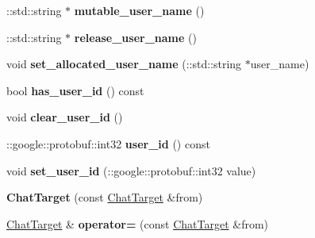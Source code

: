\begin{DoxyCompactItemize}
\item 
\hypertarget{classSimpleChat_1_1ChatTarget_a00afe8502b37643f560038dea704e5ff}{\-::std\-::string $\ast$ {\bfseries mutable\-\_\-user\-\_\-name} ()}\label{classSimpleChat_1_1ChatTarget_a00afe8502b37643f560038dea704e5ff}

\item 
\hypertarget{classSimpleChat_1_1ChatTarget_a7156ab60121584ae5364003f778588fe}{\-::std\-::string $\ast$ {\bfseries release\-\_\-user\-\_\-name} ()}\label{classSimpleChat_1_1ChatTarget_a7156ab60121584ae5364003f778588fe}

\item 
\hypertarget{classSimpleChat_1_1ChatTarget_a82559c41d4d25af52c6a5f83814eac69}{void {\bfseries set\-\_\-allocated\-\_\-user\-\_\-name} (\-::std\-::string $\ast$user\-\_\-name)}\label{classSimpleChat_1_1ChatTarget_a82559c41d4d25af52c6a5f83814eac69}

\item 
\hypertarget{classSimpleChat_1_1ChatTarget_a0831d25def649fe153f0e3075bbbfac6}{bool {\bfseries has\-\_\-user\-\_\-id} () const }\label{classSimpleChat_1_1ChatTarget_a0831d25def649fe153f0e3075bbbfac6}

\item 
\hypertarget{classSimpleChat_1_1ChatTarget_a0e07f02eeb547853bdce8e2745d55fd2}{void {\bfseries clear\-\_\-user\-\_\-id} ()}\label{classSimpleChat_1_1ChatTarget_a0e07f02eeb547853bdce8e2745d55fd2}

\item 
\hypertarget{classSimpleChat_1_1ChatTarget_a7e162e2a192107d514d2350c3ae190d2}{\-::google\-::protobuf\-::int32 {\bfseries user\-\_\-id} () const }\label{classSimpleChat_1_1ChatTarget_a7e162e2a192107d514d2350c3ae190d2}

\item 
\hypertarget{classSimpleChat_1_1ChatTarget_aa8851c988d1010b224705df2a4889116}{void {\bfseries set\-\_\-user\-\_\-id} (\-::google\-::protobuf\-::int32 value)}\label{classSimpleChat_1_1ChatTarget_aa8851c988d1010b224705df2a4889116}

\item 
\hypertarget{classSimpleChat_1_1ChatTarget_a15dc4f81b37b35fa79f8b8b2a9e343bb}{{\bfseries Chat\-Target} (const \hyperlink{classSimpleChat_1_1ChatTarget}{Chat\-Target} \&from)}\label{classSimpleChat_1_1ChatTarget_a15dc4f81b37b35fa79f8b8b2a9e343bb}

\item 
\hypertarget{classSimpleChat_1_1ChatTarget_a5c22124ec3d1affa15f661f4fef9eba9}{\hyperlink{classSimpleChat_1_1ChatTarget}{Chat\-Target} \& {\bfseries operator=} (const \hyperlink{classSimpleChat_1_1ChatTarget}{Chat\-Target} \&from)}\label{classSimpleChat_1_1ChatTarget_a5c22124ec3d1affa15f661f4fef9eba9}


\end{DoxyCompactItemize}
